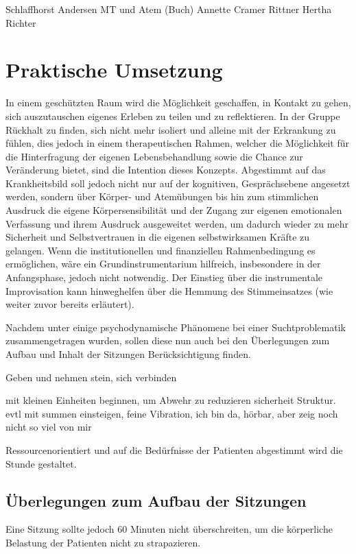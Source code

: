 Schlaffhorst Andersen
MT und Atem (Buch)
Annette Cramer
Rittner
Hertha Richter

\section{Praktische Umsetzung}
In einem geschützten Raum wird die Möglichkeit geschaffen, in Kontakt zu gehen, sich auszutauschen eigenes Erleben zu teilen und zu reflektieren. In der Gruppe Rückhalt zu finden, sich nicht mehr isoliert und alleine mit der Erkrankung zu fühlen, dies jedoch in einem therapeutischen Rahmen, welcher die Möglichkeit für die Hinterfragung der eigenen Lebensbehandlung sowie die Chance zur Veränderung bietet, sind die Intention dieses Konzepts. Abgestimmt auf das Krankheitsbild soll jedoch nicht nur auf der kognitiven, Gesprächsebene angesetzt werden, sondern über Körper- und Atemübungen bis hin zum stimmlichen Ausdruck die eigene Körpersensibilität und der Zugang zur eigenen emotionalen Verfassung und ihrem Ausdruck ausgeweitet werden, um dadurch wieder zu mehr Sicherheit und Selbstvertrauen in die eigenen selbstwirksamen Kräfte zu gelangen. Wenn die institutionellen und finanziellen Rahmenbedingung es ermöglichen, wäre ein Grundinstrumentarium hilfreich, insbesondere in der Anfangsphase, jedoch nicht notwendig. Der Einstieg über die instrumentale Improvisation kann hinweghelfen über die Hemmung des Stimmeinsatzes (wie weiter zuvor bereits erläutert).  

Nachdem unter \label{psychodynamische ueberlegungen} einige psychodynamische Phänomene bei einer Suchtproblematik zusammengetragen wurden, sollen diese nun auch bei den Überlegungen zum Aufbau und Inhalt der Sitzungen Berücksichtigung finden. 



Geben und nehmen stein, sich verbinden

mit kleinen Einheiten beginnen, um Abwehr zu reduzieren sicherheit Struktur. evtl mit summen einsteigen, feine Vibration, ich bin da, hörbar, aber zeig noch nicht so viel von mir

Ressourcenorientiert und auf die Bedürfnisse der Patienten abgestimmt wird die Stunde gestaltet.


\subsection{Überlegungen zum Aufbau der Sitzungen}

Eine Sitzung sollte jedoch 60 Minuten nicht überschreiten, um die körperliche Belastung der Patienten nicht zu strapazieren.

